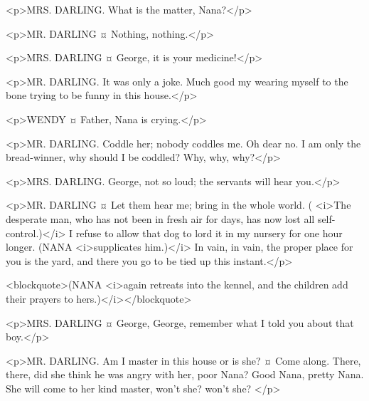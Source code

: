 <p>MRS. DARLING. What is the matter, Nana?</p>

<p>MR. DARLING ¤
Nothing, nothing.</p>

<p>MRS. DARLING ¤
George, it is your medicine!</p>


<p>MR. DARLING. It was only a joke. Much good my wearing myself to the bone trying to be funny in this house.</p>

<p>WENDY ¤
Father, Nana is crying.</p>

<p>MR. DARLING. Coddle her; nobody coddles me. Oh dear no. I am only the bread-winner, why should I be coddled? Why, why, why?</p>

<p>MRS. DARLING. George, not so loud; the servants will hear you.</p>


<p>MR. DARLING ¤
Let them hear me; bring in the whole world. ( <i>The desperate man, who has not been in fresh air for days, has now lost all self-control.)</i> I refuse to allow that dog to lord it in my nursery for one hour longer. (NANA <i>supplicates him.)</i> In vain, in vain, the proper place for you is the yard, and there you go to be tied up this instant.</p>

<blockquote>(NANA <i>again retreats into the kennel, and the children add their prayers to hers.)</i></blockquote>

<p>MRS. DARLING ¤
George, George, remember what I told you about that boy.</p>

<p>MR. DARLING. Am I master in this house or is she?
¤
Come along.
There, there, did she think he was angry with her, poor Nana?
Good Nana, pretty Nana.
She will come to her kind master, won't she? won't she?
</p>


